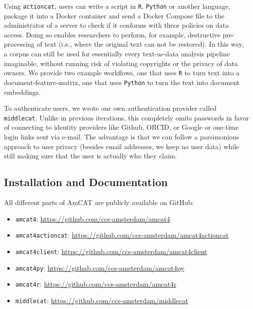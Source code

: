 \documentclass[
  a4paper,
  DIV=11,
  numbers=noendperiod]{scrartcl}
\providecommand{\tightlist}{%
  \setlength{\itemsep}{0pt}\setlength{\parskip}{0pt}}\usepackage{longtable,booktabs,array}
\begin{document}
Using \texttt{actioncat}, users can write a script in \texttt{R},
\texttt{Python} or another language, package it into a Docker container
and send a Docker Compose file to the administrator of a server to check
if it conforms with theor policies on data access. Doing so enables
researchers to perform, for example, destructive pre-processing of text
(i.e., where the original text can not be restored). In this way, a
corpus can still be used for essentially every text-as-data analysis
pipeline imaginable, without running risk of violating copyrights or the
privacy of data owners. We provide two example workflows, one that uses
\texttt{R} to turn text into a document-feature-matrix, one that uses
\texttt{Python} to turn the text into document embeddings.

To authenticate users, we wrote our own authentication provider called
\texttt{middlecat}. Unlike in previous iterations, this completely omits
passwords in favor of connecting to identity providers like Github,
ORCID, or Google or one-time login links sent via e-mail. The advantage
is that we can follow a parsimonious approach to user privacy (besides
email addresses, we keep no user data) while still making sure that the
user is actually who they claim.

\hypertarget{installation-and-documentation}{%
\subsection{Installation and
Documentation}\label{installation-and-documentation}}

All different parts of AmCAT are publicly available on GitHub:

\begin{itemize}
\tightlist
\item
  \texttt{amcat4}: \url{https://github.com/ccs-amsterdam/amcat4}
\item
  \texttt{amcat4actioncat}:
  \url{https://github.com/ccs-amsterdam/amcat4actioncat}
\item
  \texttt{amcat4client}:
  \url{https://github.com/ccs-amsterdam/amcat4client}
\item
  \texttt{amcat4py}: \url{https://github.com/ccs-amsterdam/amcat4py}
\item
  \texttt{amcat4r}: \url{https://github.com/ccs-amsterdam/amcat4r}
\item
  \texttt{middlecat}: \url{https://github.com/ccs-amsterdam/middlecat}
\end{itemize}
\end{document}
